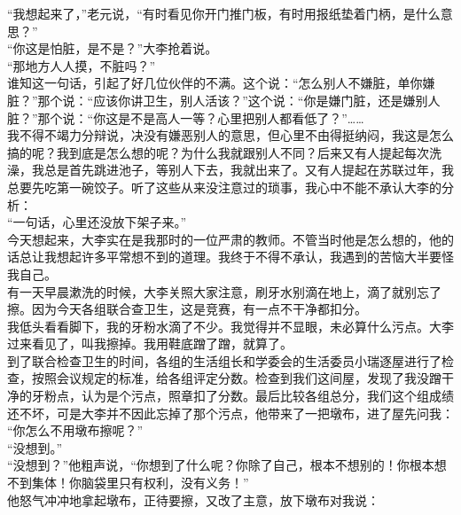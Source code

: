 “我想起来了，”老元说，“有时看见你开门推门板，有时用报纸垫着门柄，是什么意思？”\\

“你这是怕脏，是不是？”大李抢着说。\\

“那地方人人摸，不脏吗？”\\

谁知这一句话，引起了好几位伙伴的不满。这个说：“怎么别人不嫌脏，单你嫌脏？”那个说：“应该你讲卫生，别人活该？”这个说：“你是嫌门脏，还是嫌别人脏？”那个说：“你这是不是高人一等？心里把别人都看低了？”……\\

我不得不竭力分辩说，决没有嫌恶别人的意思，但心里不由得挺纳闷，我这是怎么搞的呢？我到底是怎么想的呢？为什么我就跟别人不同？后来又有人提起每次洗澡，我总是首先跳进池子，等别人下去，我就出来了。又有人提起在苏联过年，我总要先吃第一碗饺子。听了这些从来没注意过的琐事，我心中不能不承认大李的分析：\\

“一句话，心里还没放下架子来。”\\

今天想起来，大李实在是我那时的一位严肃的教师。不管当时他是怎么想的，他的话总让我想起许多平常想不到的道理。我终于不得不承认，我遇到的苦恼大半要怪我自己。\\

有一天早晨漱洗的时候，大李关照大家注意，刷牙水别滴在地上，滴了就别忘了擦。因为今天各组联合查卫生，这是竞赛，有一点不干净都扣分。\\

我低头看看脚下，我的牙粉水滴了不少。我觉得并不显眼，未必算什么污点。大李过来看见了，叫我擦掉。我用鞋底蹭了蹭，就算了。\\

到了联合检查卫生的时间，各组的生活组长和学委会的生活委员小瑞逐屋进行了检查，按照会议规定的标准，给各组评定分数。检查到我们这间屋，发现了我没蹭干净的牙粉点，认为是个污点，照章扣了分数。最后比较各组总分，我们这个组成绩还不坏，可是大李并不因此忘掉了那个污点，他带来了一把墩布，进了屋先问我：\\

“你怎么不用墩布擦呢？”\\

“没想到。”\\

“没想到？”他粗声说，“你想到了什么呢？你除了自己，根本不想别的！你根本想不到集体！你脑袋里只有权利，没有义务！”\\

他怒气冲冲地拿起墩布，正待要擦，又改了主意，放下墩布对我说：\\

